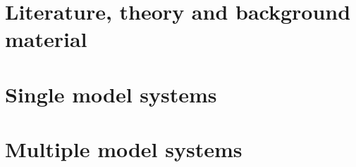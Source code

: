 \documentclass[11pt,fleqn]{report}
\theoremstyle{defstyle}
\begin{document}
\graphicspath{{./imgs/}{../imgs/}} %


\tableofcontents

\part{Literature, theory and background material}
\label{part_one}




\part{Single model systems} 
\label{part_two}

 

\part{Multiple model systems} 
\label{part_three} 






\newpage


\end{document}
